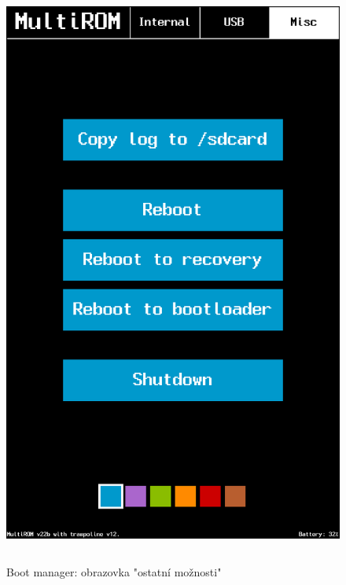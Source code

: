 \documentclass[12pt, a4paper, oneside]{article}
\begin{document}
\begin{figure}[H]
\begin{center}
 \includegraphics[height=550pt]{img/boot_manager_misc.png}
\caption{Boot manager: obrazovka "ostatní možnosti"}
\end{center}
\end{figure}
\end{document}

